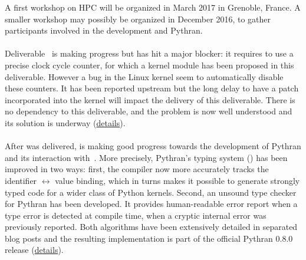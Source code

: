 \documentclass{deliverablereport}
\begin{document}
  A first workshop on HPC will be organized in March 2017 in Grenoble, France. A smaller
  workshop may possibly be organized in December 2016, to gather participants involved in
  the development and Pythran.

  \paragraph{}


  \paragraph{}
  Deliverable~ is making progress but has hit a
  major blocker: it requires to use a precise clock cycle counter, for which a kernel
  module has been proposed in this deliverable. However a bug in the Linux kernel seem to
  automatically disable these counters. It has been reported upstream but the long delay
  to have a patch incorporated into the kernel will impact the delivery of this
  deliverable. There is no dependency to this deliverable, and the problem is now well
  understood and its solution is underway
  (\href{https://github.com/OpenDreamKit/OpenDreamKit/issues/118}{details}).

  \paragraph{}

  \paragraph{}
After  was delivered,  is
  making good progress towards the development of Pythran and its interaction with~\Sage.
%
  More precisely, Pythran's typing system () has been
  improved in two ways: first, the compiler now more accurately tracks the identifier
  $\leftrightarrow$ value binding, which in turns makes it possible to generate strongly
  typed code for a wider class of Python kernels.  Second, an unsound type checker for
  Pythran has been developed. It provides human-readable error report when a type error is
  detected at compile time, when a cryptic internal error was previously reported. Both
  algorithms have been extensively detailed in separated blog posts and the resulting
  implementation is part of the official Pythran 0.8.0 release
  (\href{https://github.com/OpenDreamKit/OpenDreamKit/issues/117}{details}).
\end{document}
